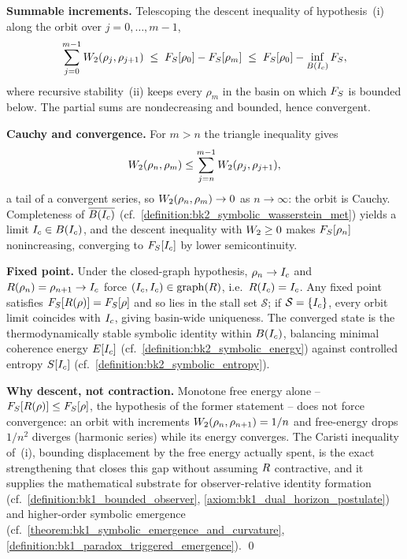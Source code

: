 \begin{demonstratio}
\label{demonstratio:bk7_convergence_within_reflective_basin}
\textbf{Summable increments.} Telescoping the descent inequality of hypothesis~(i) along the orbit over $j = 0, \dots, m-1$,
\[
\sum_{j=0}^{m-1}W_2(\rho_j,\rho_{j+1}) \;\le\; F_S[\rho_0] - F_S[\rho_m] \;\le\; F_S[\rho_0] - \inf_{B(I_c)}F_S,
\]
where recursive stability~(ii) keeps every $\rho_m$ in the basin on which $F_S$ is bounded below. The partial sums are nondecreasing and bounded, hence convergent.

\textbf{Cauchy and convergence.} For $m > n$ the triangle inequality gives
\[W_2(\rho_n,\rho_m) \le \sum_{j=n}^{m-1}W_2(\rho_j,\rho_{j+1}),\]
a tail of a convergent series, so $W_2(\rho_n,\rho_m) \to 0$ as $n \to \infty$: the orbit is Cauchy. Completeness of $\overline{B(I_c)}$ (cf.~\ref{definition:bk2_symbolic_wasserstein_met}) yields a limit $I_c \in B(I_c)$, and the descent inequality with $W_2 \ge 0$ makes $F_S[\rho_n]$ nonincreasing, converging to $F_S[I_c]$ by lower semicontinuity.

\textbf{Fixed point.} Under the closed-graph hypothesis, $\rho_n \to I_c$ and $R(\rho_n) = \rho_{n+1} \to I_c$ force $(I_c,I_c) \in \operatorname{graph}(R)$, i.e.\ $R(I_c) = I_c$. Any fixed point satisfies $F_S[R(\rho)] = F_S[\rho]$ and so lies in the stall set $\mathcal{S}$; if $\mathcal{S} = \{I_c\}$, every orbit limit coincides with $I_c$, giving basin-wide uniqueness. The converged state is the thermodynamically stable symbolic identity within $B(I_c)$, balancing minimal coherence energy $E[I_c]$ (cf.~\ref{definition:bk2_symbolic_energy}) against controlled entropy $S[I_c]$ (cf.~\ref{definition:bk2_symbolic_entropy}).

\textbf{Why descent, not contraction.} Monotone free energy alone -- $F_S[R(\rho)] \le F_S[\rho]$, the hypothesis of the former statement -- does not force convergence: an orbit with increments $W_2(\rho_n,\rho_{n+1}) = 1/n$ and free-energy drops $1/n^2$ diverges (harmonic series) while its energy converges. The Caristi inequality of~(i), bounding displacement by the free energy actually spent, is the exact strengthening that closes this gap without assuming $R$ contractive, and it supplies the mathematical substrate for observer-relative identity formation (cf.~\ref{definition:bk1_bounded_observer}, \ref{axiom:bk1_dual_horizon_postulate}) and higher-order symbolic emergence (cf.~\ref{theorem:bk1_symbolic_emergence_and_curvature}, \ref{definition:bk1_paradox_triggered_emergence}). \qed
\end{demonstratio}

